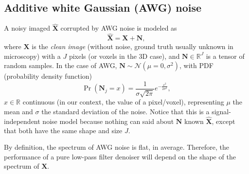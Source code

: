 \documentclass{article}
\begin{document}

\subsection{Additive white Gaussian (AWG) noise}
A noisy imaged $\hat{\mathbf X}$ corrupted by AWG noise is modeled as
\begin{equation}
  \hat{\mathbf X} = {\mathbf X} + {\mathbf N},
  \label{eq:AWG_noise_model}  
\end{equation}
where $\mathbf{X}$ is the \emph{clean image} (without noise, ground
truth usually unknown in microscopy) with a $J$ pixels (or voxels in
the 3D case), and ${\mathbf N}\in\mathbb{R}^J$ is a tensor of random
samples. In the case of AWG,
${\mathbf N}\sim{\mathcal N}(\mu=0,\sigma^2)$, with PDF (probability
density function)
\begin{equation}
  \Pr({\mathbf N}_j{=}x) = \frac 1 {\sigma\sqrt{2\pi}} e^{-\frac{x^2}{2\sigma^2} },
\end{equation}
$x\in\mathbb{R}$ continuous (in our context, the value of a
pixel/voxel), representing $\mu$ the mean and $\sigma$ the standard
deviation of the noise. Notice that this is a signal-independent noise
model because nothing can said about ${\mathbf N}$ known
$\hat{\mathbf X}$, except that both have the same shape and size
$J$.

By definition, the spectrum of AWG noise is flat, in
average. Therefore, the performance of a pure low-pass filter denoiser
will depend on the shape of the spectrum of $\mathbf{X}$.
\end{document}
